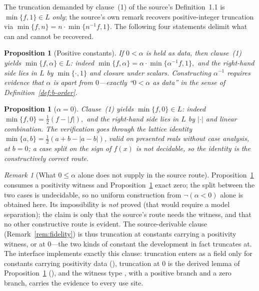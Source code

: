 \documentclass[11pt]{article}
\newtheorem{proposition}[theorem]{Proposition}
\theoremstyle{definition}
\theoremstyle{remark}
\newtheorem{remark}[theorem]{Remark}
\begin{document}
The truncation demanded by clause~(1) of the source's Definition~1.1 is $\min\{f,1\}\in L$ \emph{only}; the source's own remark recovers positive-integer truncation via $\min\{f,n\}=n\cdot\min\{n^{-1}f,1\}$.  The following four statements delimit what can and cannot be recovered.

\begin{proposition}[Positive constants]
\label{prop:b-poscut}
If $0<\alpha$ is held as data, then clause~(1) yields $\min\{f,\alpha\}\in L$: indeed
\(
\min\{f,\alpha\}=\alpha\cdot\min\{\alpha^{-1}f,1\},
\)
and the right-hand side lies in $L$ by $\min\{\cdot,1\}$ and closure under scalars.  Constructing $\alpha^{-1}$ requires evidence that $\alpha$ is apart from $0$---exactly ``$0<\alpha$ as data'' in the sense of Definition~\ref{def:b-order}.
\end{proposition}

\begin{proposition}[$\alpha=0$]
\label{prop:b-zerocut}
Clause~(1) yields $\min\{f,0\}\in L$: indeed
\(
\min\{f,0\}=\tfrac12(f-|f|),
\)
and the right-hand side lies in $L$ by $|\cdot|$ and linear combination.  The verification goes through the lattice identity $\min\{a,b\}=\tfrac12(a+b-|a-b|)$, valid on presented reals \emph{without case analysis}, at $b=0$; a case split on the sign of $f(x)$ is not decidable, so the identity is the constructively correct route.
\end{proposition}

\begin{remark}[What $0\le\alpha$ alone does not supply in the source route]
\label{rem:b-nonneg}
Proposition~\ref{prop:b-poscut} consumes a positivity witness and Proposition~\ref{prop:b-zerocut} exact zero; the split between the two cases is undecidable, so no uniform construction from $\neg(\alpha<0)$ alone is obtained here.  Its impossibility is \emph{not} proved (that would require a model separation); the claim is only that the source's route needs the witness, and that no other constructive route is evident.  The source-derivable clause (Remark~\ref{rem:fidelity}) is thus truncation at constants carrying a positivity witness, or at $0$---the two kinds of constant the development in fact truncates at.  The interface implements exactly this clause: truncation enters as a field only for constants carrying positivity data (), truncation at $0$ is the derived lemma of Proposition~\ref{prop:b-zerocut} (), and the witness type , with a positive branch and a zero branch, carries the evidence to every use site.
\end{remark}
\end{document}
